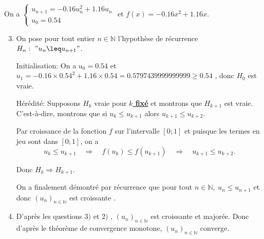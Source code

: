\documentclass[15pt, mathserif]{beamer}
\begin{document}
\begin{frame}On a $\begin{cases} u_{n+1} = -0.16u_n^2+1.16u_n\\[1em] u_0 = 0.54\end{cases}$ et $f(x) = -0.16x^2+1.16x$.

\begin{enumerate}\setcounter{enumi}{2}

	\item On pose pour tout entier $n \in \mathbb{N}$ l'hypothèse de récurrence $H_n:~" u_n \leq u_{n+1}"$.

\medskip

Initialisation: On a $u_0 =0.54$ et $u_1 = -0.16\times0.54^2+1.16\times0.54 = 0.5797439999999999\geq 0.54$ , donc $H_0$ est vraie.

\medskip

Hérédité: Supposons $H_k$ vraie pour \textbf\underline{{$k$ fixé}} et montrons que $H_{k+1}$ est vraie. C'est-à-dire, montrons que si $u_k \leq  u_{k+1}$ alors $u_{k+1} \leq  u_{k+2}$.

 Par croissance de la fonction $f$ sur l'intervalle $[0;1]$ et puisque les termes en jeu sont dans $[0;1]$, on a \[ u_k \leq u_{k+1} \quad \Rightarrow \quad f(u_k) \leq  f(u_{k+1}) \quad \Rightarrow \quad  u_{k+1}\leq u_{k+2}. \]

Donc $H_{k} \Rightarrow H_{k+1}$.

 On a finalement démontré par récurrence que pour tout $n \in\mathbb{N},~ u_n \leq u_{n+1}$ et donc $(u_n)_{n\in\mathbb{N}}$ est  croissante .

\end{enumerate}
\end{frame}


\begin{frame}

\begin{enumerate}\setcounter{enumi}{3}

	\item D'après les questions $3)$ et $2)$ , $(u_n)_{n\in\mathbb{N}}$ est croissante et majorée. Donc d'après le théorème de convergence monotone, $(u_n)_{n\in\mathbb{N}}$ converge.

\end{enumerate}\end{frame}
\end{document}
